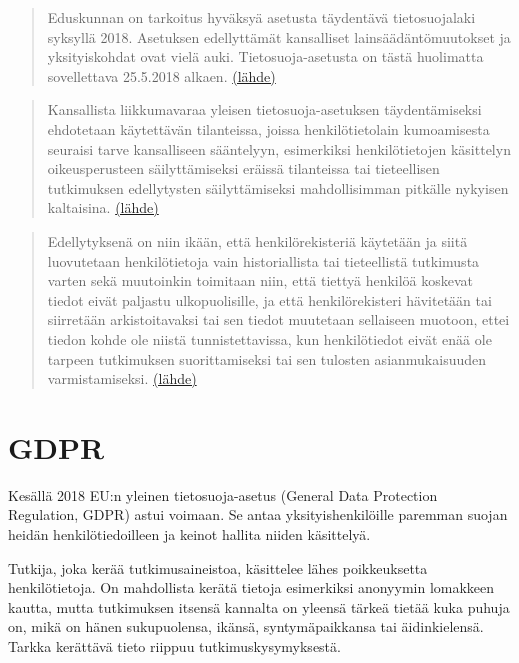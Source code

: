 \documentclass[]{book}
\begin{document}
\begin{quote}
Eduskunnan on tarkoitus hyväksyä asetusta täydentävä tietosuojalaki
syksyllä 2018. Asetuksen edellyttämät kansalliset lainsäädäntömuutokset
ja yksityiskohdat ovat vielä auki. Tietosuoja-asetusta on tästä
huolimatta sovellettava 25.5.2018 alkaen.
\href{https://ek.fi/mita-teemme/yrityslainsaadanto/tietosuojalainsaadanto/tietopaketti-yrityksille-on-aika-valmistautua-eun-yleiseen-tietosuoja-asetukseen/}{(lähde)}
\end{quote}

\begin{quote}
Kansallista liikkumavaraa yleisen tietosuoja-asetuksen täydentämiseksi
ehdotetaan käytettävän tilanteissa, joissa henkilötietolain kumoamisesta
seuraisi tarve kansalliseen sääntelyyn, esimerkiksi henkilötietojen
käsittelyn oikeusperusteen säilyttämiseksi eräissä tilanteissa tai
tieteellisen tutkimuksen edellytysten säilyttämiseksi mahdollisimman
pitkälle nykyisen kaltaisina.
\href{https://www.eduskunta.fi/FI/vaski/HallituksenEsitys/Sivut/HE_9+2018.aspx}{(lähde)}
\end{quote}

\begin{quote}
Edellytyksenä on niin ikään, että henkilörekisteriä käytetään ja siitä
luovutetaan henkilötietoja vain historiallista tai tieteellistä
tutkimusta varten sekä muutoinkin toimitaan niin, että tiettyä henkilöä
koskevat tiedot eivät paljastu ulkopuolisille, ja että henkilörekisteri
hävitetään tai siirretään arkistoitavaksi tai sen tiedot muutetaan
sellaiseen muotoon, ettei tiedon kohde ole niistä tunnistettavissa, kun
henkilötiedot eivät enää ole tarpeen tutkimuksen suorittamiseksi tai sen
tulosten asianmukaisuuden varmistamiseksi.
\href{https://www.eduskunta.fi/FI/vaski/HallituksenEsitys/Sivut/HE_9+2018.aspx}{(lähde)}
\end{quote}

\hypertarget{gdpr}{%
\section{GDPR}\label{gdpr}}

Kesällä 2018 EU:n yleinen tietosuoja-asetus (General Data Protection
Regulation, GDPR) astui voimaan. Se antaa yksityishenkilöille paremman
suojan heidän henkilötiedoilleen ja keinot hallita niiden käsittelyä.

Tutkija, joka kerää tutkimusaineistoa, käsittelee lähes poikkeuksetta
henkilötietoja. On mahdollista kerätä tietoja esimerkiksi anonyymin
lomakkeen kautta, mutta tutkimuksen itsensä kannalta on yleensä tärkeä
tietää kuka puhuja on, mikä on hänen sukupuolensa, ikänsä,
syntymäpaikkansa tai äidinkielensä. Tarkka kerättävä tieto riippuu
tutkimuskysymyksestä.
\end{document}
